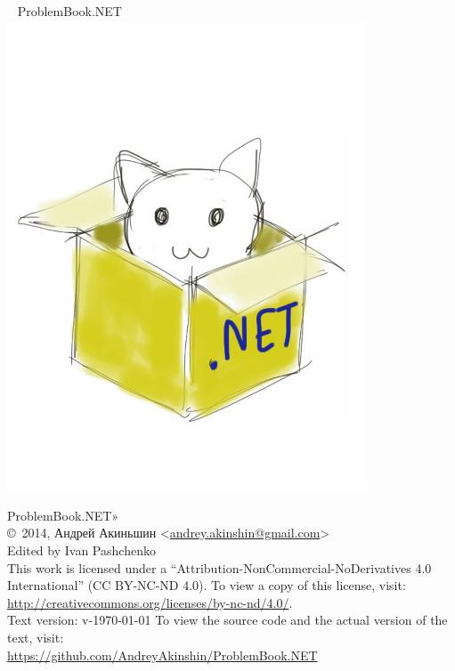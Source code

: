 \begin{center}
~\vspace{4cm}\newline
{\Huge{ProblemBook.NET}}
\includegraphics[width=0.8\textwidth]{cover}
\end{center}
\newpage

\hbox{}
\vfill
{
\noindent
ProblemBook.NET»\\
\copyright\ 2014, Андрей Акиньшин <\href{mailto:andrey.akinshin@gmail.com}{andrey.akinshin@gmail.com}>\\
Edited by Ivan Pashchenko\\

\medskip
\noindent
This work is licensed under a ``Attribution-NonCommercial-NoDerivatives 4.0 International'' (CC BY-NC-ND 4.0). To view a copy of this license, visit:\\ \url{http://creativecommons.org/licenses/by-nc-nd/4.0/}.\\
Text version: v-\versiondate\today \newline
To view the source code and the actual version of the text, visit:\\ \url{https://github.com/AndreyAkinshin/ProblemBook.NET}
}
\newpage
